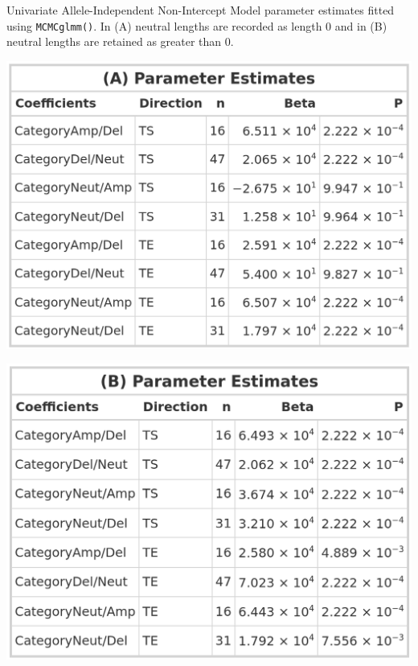 \begin{table}[!htb]
    \caption[Univariate Allele-Independent Non-Intercept Model parameter estimates fitted using \texttt{MCMCglmm()}.]{Univariate Allele-Independent Non-Intercept Model parameter estimates fitted using \texttt{MCMCglmm()}. In (A) neutral lengths are recorded as length 0 and in (B) neutral lengths are retained as greater than 0.}
     \begin{subtable}[t]{.49\textwidth}
      \centering
      \includegraphics[width = 1\textwidth]{../tables/Chapter_5/Univariate_MCMC_6_AI_Model.png}
    \end{subtable}%
    \hspace{0.5cm}
     \begin{subtable}[t]{.49\textwidth}
      \centering
         \includegraphics[width = 1\textwidth]{../tables/Chapter_5/Univariate_MCMC_6_Neut_AI_Model.png}
    \end{subtable} 
\end{table}

